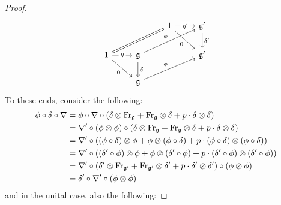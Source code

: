 \begin{proof}
                    $$
                        \begin{tikzcd}
                        	&& {1} & {\g'} \\
                        	{1} & {\g} && {\g'} \\
                        	& {\g}
                        	\arrow["{\phi}", from=2-2, to=1-4]
                        	\arrow["{\phi}", from=3-2, to=2-4]
                        	\arrow["{\eta}" description, from=2-1, to=2-2]
                        	\arrow["{\delta}", from=2-2, to=3-2]
                        	\arrow["{\delta'}", from=1-4, to=2-4]
                        	\arrow["{\eta'}" description, from=1-3, to=1-4]
                        	\arrow[Rightarrow, from=2-1, to=1-3, no head]
                        	\arrow["{0}"', from=2-1, to=3-2]
                        	\arrow["{0}"', from=1-3, to=2-4]
                        \end{tikzcd}
                    $$
                To these ends, consider the following:
                    $$
                        \begin{aligned}
                            \phi \circ \delta \circ \nabla & = \phi \circ \nabla \circ \left(\delta \tensor \Frob_{\g} + \Frob_{\g} \tensor \delta + p \cdot \delta \tensor \delta\right)
                            \\
                            & = \nabla' \circ (\phi \tensor \phi) \circ \left(\delta \tensor \Frob_{\g} + \Frob_{\g} \tensor \delta + p \cdot \delta \tensor \delta\right)
                            \\
                            & = \nabla' \circ \left((\phi \circ \delta) \tensor \phi + \phi \tensor (\phi \circ \delta) + p \cdot (\phi \circ \delta) \tensor (\phi \circ \delta)\right)
                            \\
                            & = \nabla' \circ \left((\delta' \circ \phi) \tensor \phi + \phi \tensor (\delta' \circ \phi) + p \cdot (\delta' \circ \phi) \tensor (\delta' \circ \phi)\right)
                            \\
                            & = \nabla' \circ \left(\delta' \tensor \Frob_{\g'} + \Frob_{\g'} \tensor \delta' + p \cdot \delta' \tensor \delta'\right) \circ (\phi \tensor \phi)
                            \\
                            & = \delta' \circ \nabla' \circ (\phi \tensor \phi)
                        \end{aligned}
                    $$
                and in the unital case, also the following:

\end{proof}
